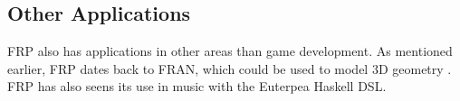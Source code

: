 \subsection{Other Applications}
\gls{FRP} also has applications in other areas than game development. As mentioned earlier, \gls{FRP} dates back to FRAN, which could be used to model 3D geometry \cite{ElliottHudak97:Fran}. \gls{FRP} has also seens its use in music with the Euterpea Haskell \gls{DSL}.  








